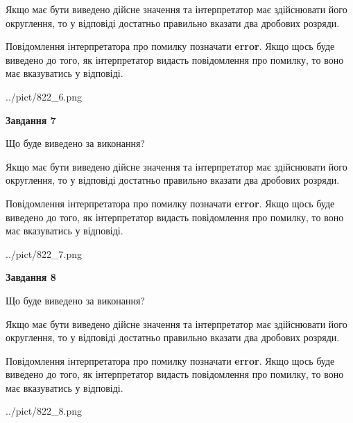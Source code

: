 \documentclass[12pt, ukrainian]{article}
\begin{document}
{\begin {Large}
Якщо має бути виведено дійсне значення та інтерпретатор має здійснювати його округлення, 
то у відповіді достатньо правильно вказати два дробових розряди.

Повідомлення інтерпретатора про помилку позначати \textbf{error}.
Якщо щось буде виведено до того, як інтерпретатор видасть повідомлення про помилку, 
то воно має вказуватись у відповіді. \par

\begin{center}
	{../pict/822_6.png}
\end{center}
\newpage

{\begin {center}\textbf{Завдання 7}\end {center}}\par
Що буде виведено за виконання? \par

Якщо має бути виведено дійсне значення та інтерпретатор має здійснювати його округлення, 
то у відповіді достатньо правильно вказати два дробових розряди.

Повідомлення інтерпретатора про помилку позначати \textbf{error}.
Якщо щось буде виведено до того, як інтерпретатор видасть повідомлення про помилку, 
то воно має вказуватись у відповіді. \par

\begin{center}
	{../pict/822_7.png}
\end{center}
\newpage

{\begin {center}\textbf{Завдання 8}\end {center}}\par
Що буде виведено за виконання? \par

Якщо має бути виведено дійсне значення та інтерпретатор має здійснювати його округлення, 
то у відповіді достатньо правильно вказати два дробових розряди.

Повідомлення інтерпретатора про помилку позначати \textbf{error}.
Якщо щось буде виведено до того, як інтерпретатор видасть повідомлення про помилку, 
то воно має вказуватись у відповіді. \par

\begin{center}
	{../pict/822_8.png}
\end{center}
\newpage


\end{Large}}
\end{document}
